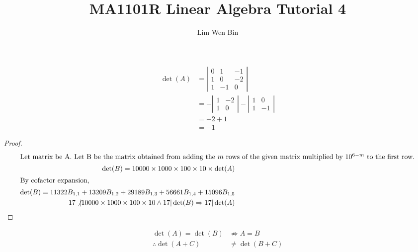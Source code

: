 \documentclass[12pt]{article}
\newenvironment{problem}[2][Problem]{\begin{trivlist}
\item[\hskip \labelsep {\bfseries #1}\hskip \labelsep {\bfseries #2.}]}{\end{trivlist}}
\begin{document}
\title{MA1101R Linear Algebra Tutorial 4}
\author{Lim Wen Bin}
\maketitle
 


\begin{problem}{1.a.i}
\end{problem}
\begin{align*}
\det(A) &= 
	\left| 
	\begin{array}{ccc}
	0 & 1 & -1\\
	1 & 0 & -2\\
	1 & -1 & 0 
	\end{array} 
	\right| \\
&= - \left| 
	\begin{array}{cc}
	1 & -2\\
	1 & 0 
	\end{array} 
	\right| -
	\left| 
	\begin{array}{cc}
	1 & 0 \\
	1 & -1
	\end{array} 
	\right| \\
&=  -2 + 1 \\
&= -1
\end{align*}

\begin{problem}{2}
\end{problem}
\begin{proof}
\begin{align*} 
\intertext{Let matrix be A. Let B be the matrix obtained from adding the $m$ rows of the given matrix multiplied by $10^{6-m}$ to the first row.}
\det(B) = 10000 \times 1000 \times 100 \times 10 \times \det(A) \\
\intertext{By cofactor expansion,}
\det(B) = 11322 B_{1,1} + 13209 B_{1,2} + 29189 B_{1,3} + 56661 B_{1,4} + 15096 B_{1,5} \\
17 \not | 10000 \times 1000 \times 100 \times 10 \land 17 | \det(B) \Rightarrow 17 | \det(A)
\end{align*}
\end{proof}

\begin{problem}{3.c}
\end{problem}
\begin{align*} 
\det(A) = \det(B) &\not \Rightarrow A = B \\
\therefore \det(A+C) &\ne \det(B+C)
\end{align*}
\end{document}
